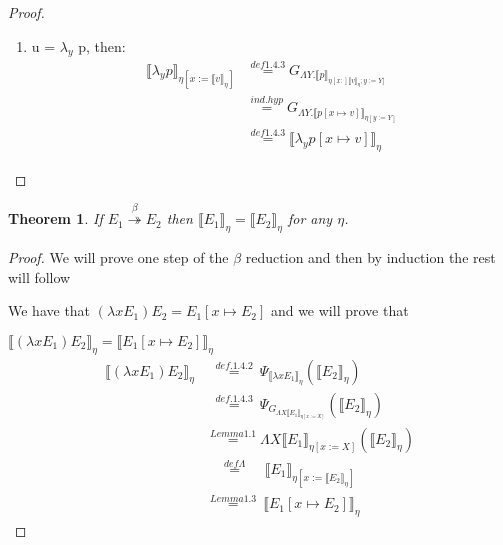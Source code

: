 \documentclass{article}
\newtheorem{theorem}{Theorem}[section] %
\begin{document}
\begin{proof}
\begin{enumerate}
			\item u = $\lambda_y$ p, then:
			\begin{equation*}
			\begin{split}
				\llbracket \lambda_y p \rrbracket_{\eta [x := 
				\llbracket v \rrbracket_{\eta}]}
 				&\stackrel{def 1.4.3}{=}
				G_{\Lambda Y. \llbracket p \rrbracket_{
					\eta [x :] \llbracket v \rrbracket_{\eta} ; 
						y := Y]}} \\
 				&\stackrel{ind.hyp}{=}
				G_{\Lambda Y. \llbracket p[x \mapsto v] \rrbracket_{
					\eta[ y:=Y]} } \\
 				&\stackrel{def 1.4.3}{=}
				\llbracket \lambda_y p[x \mapsto v]\rrbracket_{\eta}
			\end{split}
			\end{equation*}
		\end{enumerate}
	\end{proof}

	\begin{theorem}
		If $E_1 \stackrel{\beta}{\twoheadrightarrow}  E_2$ then 
			$\llbracket E_1
		\rrbracket_{\eta} = \llbracket E_2 \rrbracket_{\eta}$
		for any $\eta$.
	\end{theorem}
	\begin{proof}
		We will prove one step of the $\beta$ reduction and then
		by induction the rest will follow

		We have that $(\lambda x E_1) E_2 = E_1 [x \mapsto E_2]$
		and we will prove that 

		$\llbracket (\lambda x E_1) E_2
		\rrbracket_{\eta} = \llbracket E_1 [x \mapsto E_2] 
		\rrbracket_{\eta}$
		\begin{equation*}
     \begin{split}
			\llbracket (\lambda x E_1) E_2 \rrbracket_{\eta}
			&\:\,\stackrel{def. 1.4.2}{=} \:
			\Psi_{\llbracket \lambda x E_1 \rrbracket_{\eta}}
				(\llbracket E_2 \rrbracket_{\eta}) \\
			&\:\,\stackrel{def. 1.4.3}{=} \:
			\Psi_{G_{\Lambda X \llbracket E_1 \rrbracket_{
				\eta [x := X]}}}
				(\llbracket E_2 \rrbracket_{\eta}) \\
			&\stackrel{Lemma 1.1}{=}
				\Lambda X \llbracket E_1 \rrbracket_{\eta [x := X]}
				(\llbracket E_2 \rrbracket_{\eta}) \\
			&\;\;\:\:\stackrel{def \Lambda}{=}\:\:\:\:\:
				\llbracket E_1 \rrbracket_
					{\eta [x := \llbracket E_2 \rrbracket_{\eta}]} \\
			&\stackrel{Lemma 1.3}{=}\:
				\llbracket E_1 [ x \mapsto E_2 ] \rrbracket_{\eta}
     \end{split}
		\end{equation*}
	\end{proof}
\end{document}
